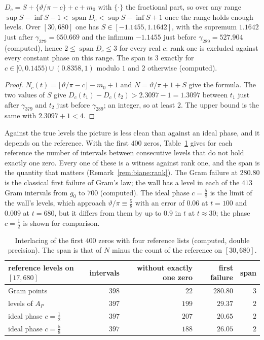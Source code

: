 \begin{proposition}\label{prop:biane:span}
$D_c=S+\{\vartheta/\pi-c\}+c+m_0$ with $\{\cdot\}$ the fractional part, so over any range $\sup S-\inf S-1<\operatorname{span}D_c<\sup S-\inf S+1$ once the range holds enough levels. Over $[30,680]$ one has $S\in[-1.1455,1.1642]$, with the supremum $1.1642$ just after $\gamma_{379}=650.669$ and the infimum $-1.1455$ just before $\gamma_{289}=527.904$ (computed), hence $2\le\operatorname{span}D_c\le3$ for every real $c$: rank one is excluded against every constant phase on this range. The span is $3$ exactly for $c\in[0,0.1455)\cup(0.8358,1)$ modulo $1$ and $2$ otherwise (computed).
\end{proposition}

\begin{proof}
$N_c(t)=\lfloor\vartheta/\pi-c\rfloor-m_0+1$ and $N=\vartheta/\pi+1+S$ give the formula. The two values of $S$ give $D_c(t_1)-D_c(t_2)>2.3097-1=1.3097$ between $t_1$ just after $\gamma_{379}$ and $t_2$ just before $\gamma_{289}$; an integer, so at least $2$. The upper bound is the same with $2.3097+1<4$.
\end{proof}

Against the true levels the picture is less clean than against an ideal phase, and it depends on the reference. With the first $400$ zeros, Table~\ref{tab:biane:interlace} gives for each reference the number of intervals between consecutive levels that do not hold exactly one zero. Every one of these is a witness against rank one, and the span is the quantity that matters (Remark~\ref{rem:biane:rank}). The Gram failure at $280.80$ is the classical first failure of Gram's law; the wall has a level in each of the $413$ Gram intervals from $g_0$ to $700$ (computed). The ideal phase $c=\frac58$ is the limit of the wall's levels, which approach $\vartheta/\pi\equiv\frac58$ with an error of $0.06$ at $t=100$ and $0.009$ at $t=680$, but it differs from them by up to $0.9$ in $t$ at $t\approx30$; the phase $c=\frac12$ is shown for comparison.

\begin{table}[ht]
\centering\small
\begin{tabular}{lrrrr}
\toprule
reference levels on $[17,680]$ & intervals & without exactly one zero & first failure & span\\
\midrule
Gram points & $398$ & $22$ & $280.80$ & $3$\\
levels of $A_P$ & $397$ & $199$ & $29.37$ & $2$\\
ideal phase $c=\frac12$ & $397$ & $207$ & $20.65$ & $2$\\
ideal phase $c=\frac58$ & $397$ & $188$ & $26.05$ & $2$\\
\bottomrule
\end{tabular}
\caption{Interlacing of the first $400$ zeros with four reference lists (computed, double precision). The span is that of $N$ minus the count of the reference on $[30,680]$.}\label{tab:biane:interlace}
\end{table}

